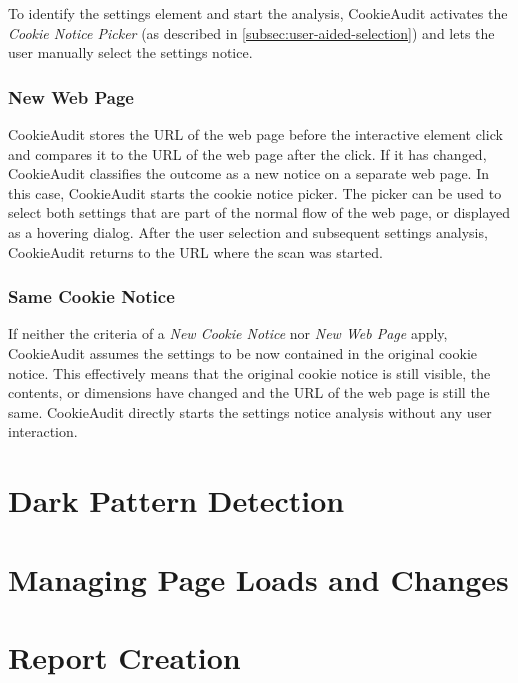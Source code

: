 To identify the settings element and start the analysis, CookieAudit activates the \emph{Cookie Notice Picker} (as described in \cref{subsec:user-aided-selection}) and lets the user manually select the settings notice.

\subsubsection{New Web Page}
CookieAudit stores the URL of the web page before the interactive element click and compares it to the URL of the web page after the click.
If it has changed, CookieAudit classifies the outcome as a new notice on a separate web page.
In this case, CookieAudit starts the cookie notice picker. 
The picker can be used to select both settings that are part of the normal flow of the web page, or displayed as a hovering dialog.
After the user selection and subsequent settings analysis, CookieAudit returns to the URL where the scan was started.

\subsubsection{Same Cookie Notice}
If neither the criteria of a \emph{New Cookie Notice} nor \emph{New Web Page} apply, CookieAudit assumes the settings to be now contained in the original cookie notice.
This effectively means that the original cookie notice is still visible, the contents, or dimensions have changed and the URL of the web page is still the same.
CookieAudit directly starts the settings notice analysis without any user interaction.

\section{Dark Pattern Detection}
\section{Managing Page Loads and Changes}
\section{Report Creation}
